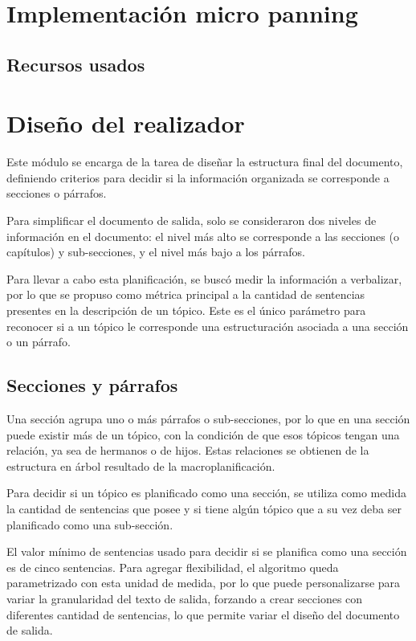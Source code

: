 \section{Implementación micro panning}

\subsection{Recursos usados}

\section{Diseño del realizador}
Este módulo se encarga de la tarea de diseñar la estructura final del documento, definiendo criterios para decidir si la información organizada se corresponde a secciones o párrafos.

Para simplificar el documento de salida, solo se consideraron dos niveles de información en el documento: el nivel más alto se corresponde a las secciones (o capítulos) y sub-secciones, y el nivel más bajo a los párrafos. 

Para llevar a cabo esta planificación, se buscó medir la información a verbalizar, por lo que se propuso como métrica principal a la cantidad de sentencias presentes en la descripción de un tópico. Este es el único parámetro para reconocer si a un tópico le corresponde una estructuración asociada a una sección o un párrafo. 

\subsection{Secciones y párrafos}
Una sección agrupa uno o más párrafos o sub-secciones, por lo que en una sección puede existir más de un tópico, con la condición de que esos tópicos tengan una relación, ya sea de hermanos o de hijos. Estas relaciones se obtienen de la estructura en árbol resultado de la macroplanificación. 

Para decidir si un tópico es planificado como una sección, se utiliza como medida la cantidad de sentencias que posee y si tiene algún tópico que a su vez deba ser planificado como una sub-sección.

El valor mínimo de sentencias usado para decidir si se planifica como una sección es de cinco sentencias. Para agregar flexibilidad, el algoritmo queda parametrizado con esta unidad de medida, por lo que puede personalizarse para variar la granularidad del texto de salida, forzando a crear secciones con diferentes cantidad de sentencias, lo que permite variar el diseño del documento de salida.

